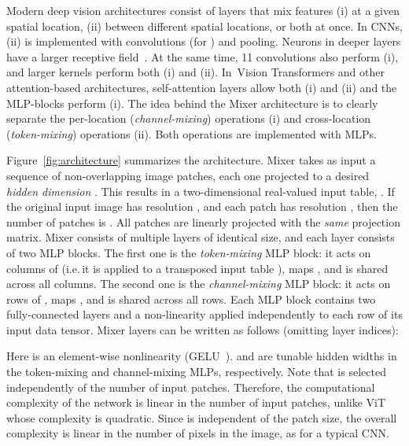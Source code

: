 \documentclass{article}
\newcommand{\name}{Mixer}
\begin{document}
Modern deep vision architectures consist of layers that mix features (i) at a given spatial location, (ii) between different spatial locations, or both at once.
In CNNs, (ii) is implemented with  convolutions (for ) and pooling.
Neurons in deeper layers have a larger receptive field~\citep{araujo2019computing,luo2017understanding}.
At the same time, 11 convolutions also perform (i), and larger kernels perform both (i) and (ii).
In~Vision Transformers and other attention-based architectures, self-attention layers allow both (i) and (ii) and the MLP-blocks perform (i).
The idea behind the \name{} architecture is to clearly separate the per-location (\emph{channel-mixing}) operations (i) and cross-location (\emph{token-mixing}) operations (ii).
Both operations are implemented with MLPs.

Figure~\ref{fig:architecture} summarizes the architecture. 
\name{} takes as input a sequence of  non-overlapping image patches, each one projected to a desired \emph{hidden dimension} .
This results in a two-dimensional real-valued input table, .
If the original input image has resolution ,
and each patch has resolution ,
then the number of patches is .
All patches are linearly projected with the \emph{same} projection matrix.
\name{} consists of multiple layers of identical size, and each layer consists of two MLP blocks.
The first one is the \emph{token-mixing} MLP block: it acts on columns of  (i.e.\,it is applied to a transposed input table ), maps , and is shared across all columns.
The second one is the \emph{channel-mixing} MLP block: it acts on rows of , maps , and is shared across all rows.
Each MLP block contains two fully-connected layers and a non-linearity applied independently to each row of its input data tensor. 
\name{} layers can be written as follows (omitting layer indices):

Here  is an element-wise nonlinearity (GELU~\cite{hendrycks2016gelu}).
 and  are tunable hidden widths in the token-mixing and channel-mixing MLPs, respectively.
Note that  is selected independently of the number of input patches.
Therefore, the computational complexity of the network is linear in the number of input patches, unlike ViT whose complexity is quadratic.
Since  is independent of the patch size, the overall complexity is linear in the number of pixels in the image, as for a typical CNN.
\end{document}
